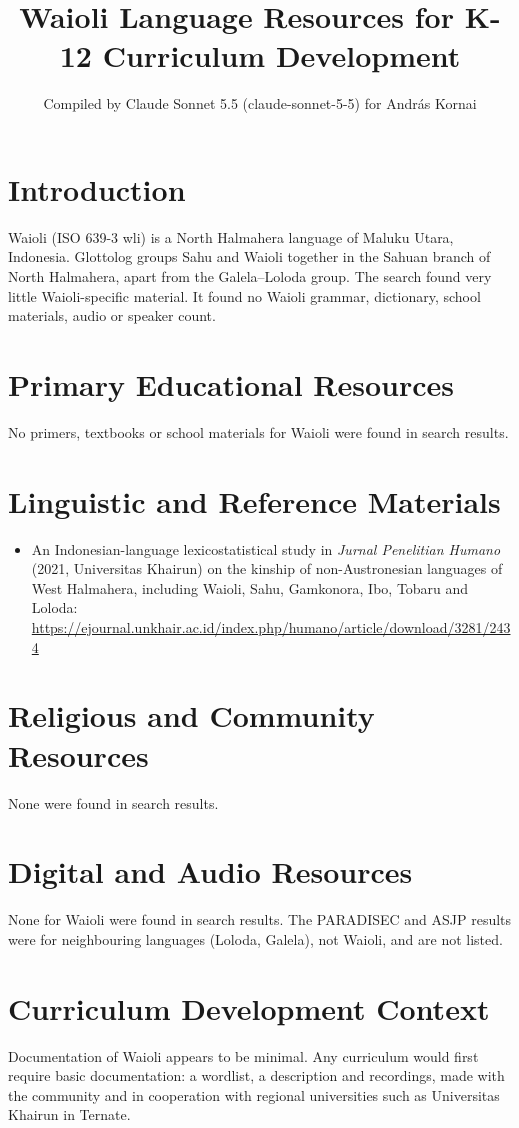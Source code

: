 \documentclass[12pt]{article}
\title{Waioli Language Resources for K-12 Curriculum Development}
\author{Compiled by Claude Sonnet 5.5 (claude-sonnet-5-5) for Andr\'as Kornai}
\date{}
\begin{document}
\maketitle

\section{Introduction}
Waioli (ISO 639-3 wli) is a North Halmahera language of Maluku Utara, Indonesia. Glottolog groups Sahu and Waioli together in the Sahuan branch of North Halmahera, apart from the Galela--Loloda group. The search found very little Waioli-specific material. It found no Waioli grammar, dictionary, school materials, audio or speaker count.

\section{Primary Educational Resources}
No primers, textbooks or school materials for Waioli were found in search results.

\section{Linguistic and Reference Materials}
\begin{itemize}
\item An Indonesian-language lexicostatistical study in \emph{Jurnal Penelitian Humano} (2021, Universitas Khairun) on the kinship of non-Austronesian languages of West Halmahera, including Waioli, Sahu, Gamkonora, Ibo, Tobaru and Loloda: \url{https://ejournal.unkhair.ac.id/index.php/humano/article/download/3281/2434}
\end{itemize}

\section{Religious and Community Resources}
None were found in search results.

\section{Digital and Audio Resources}
None for Waioli were found in search results. The PARADISEC and ASJP results were for neighbouring languages (Loloda, Galela), not Waioli, and are not listed.

\section{Curriculum Development Context}
Documentation of Waioli appears to be minimal. Any curriculum would first require basic documentation: a wordlist, a description and recordings, made with the community and in cooperation with regional universities such as Universitas Khairun in Ternate.
\end{document}
